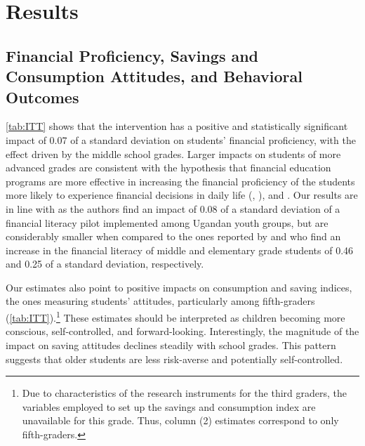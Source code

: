 \section{Results} \label{sec:results}

\subsection{Financial Proficiency, Savings and Consumption Attitudes, and Behavioral Outcomes} \label{subsec:literacy}


\autoref{tab:ITT} shows that the intervention has a positive and statistically significant impact of 0.07 of a standard deviation on students' financial proficiency, with the effect driven by the middle school grades. Larger impacts on students of more advanced grades are consistent with the hypothesis that financial education programs are more effective in increasing the financial proficiency of the students more likely to experience financial decisions in daily life (\cite{frisancho2020impact}, \cite{Bruhn2016}), and \cite{zia2023financial}. Our results are in line with \cite{jamison2014financial} as the authors find an impact of 0.08 of a standard deviation of a financial literacy pilot implemented among Ugandan youth groups, but are considerably smaller when compared to the ones reported by \cite{de2021effect} and \cite{batty2020experiential} who find an increase in the financial literacy of middle and elementary grade students of 0.46 and 0.25 of a standard deviation, respectively. 

Our estimates also point to positive impacts on consumption and saving indices, the ones measuring students' attitudes, particularly among fifth-graders (\autoref{tab:ITT}).\footnote{Due to characteristics of the research instruments for the third graders, the variables employed to set up the savings and consumption index are unavailable for this grade. Thus, column (2) estimates correspond to only fifth-graders.} These estimates should be interpreted as children becoming more conscious, self-controlled, and forward-looking. Interestingly, the magnitude of the impact on saving attitudes declines steadily with school grades. This pattern suggests that older students are less risk-averse and potentially self-controlled. 


